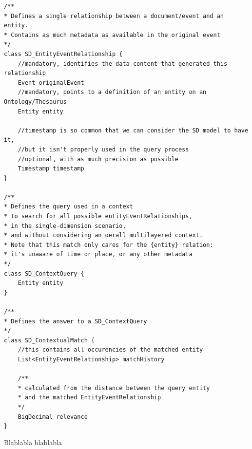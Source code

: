 \begin{verbatim}
/**
* Defines a single relationship between a document/event and an entity.
* Contains as much metadata as available in the original event
*/
class SD_EntityEventRelationship {
    //mandatory, identifies the data content that generated this relationship
    Event originalEvent
    //mandatory, points to a definition of an entity on an Ontology/Thesaurus
    Entity entity

    //timestamp is so common that we can consider the SD model to have it,
    //but it isn't properly used in the query process
    //optional, with as much precision as possible
    Timestamp timestamp
}

/**
* Defines the query used in a context
* to search for all possible entityEventRelationships,
* in the single-dimension scenario,
* and without considering an oerall multilayered context.
* Note that this match only cares for the {entity} relation:
* it's unaware of time or place, or any other metadata
*/
class SD_ContextQuery {
    Entity entity
}

/**
* Defines the answer to a SD_ContextQuery
*/
class SD_ContextualMatch {
    //this contains all occurencies of the matched entity
    List<EntityEventRelationship> matchHistory

    /**
    * calculated from the distance between the query entity
    * and the matched EntityEventRelationship
    */
    BigDecimal relevance
}
\end{verbatim}

Blablabla blablabla

\newpage


